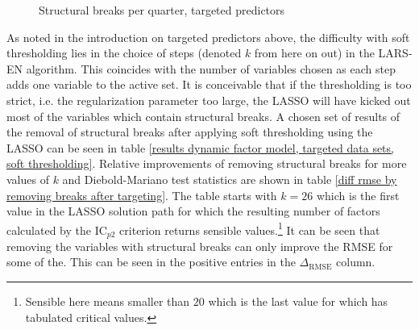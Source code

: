 \documentclass[12pt]{article}
\begin{document}
\begin{figure}[htp]
\centering
{}
\caption{Structural breaks per quarter, targeted predictors}
\label{structural breaks per period, targeted predictors}
\end{figure}



\clearpage

As noted in the introduction on targeted predictors above, the difficulty with soft thresholding lies in the choice of steps (denoted $k$ from here on out) in the LARS-EN algorithm. This coincides with the number of variables chosen as each step adds one variable to the active set. It is conceivable that if the thresholding is too strict, i.e. the regularization parameter too large, the LASSO will have kicked out most of the variables which contain structural breaks. A chosen set of results of the removal of structural breaks after applying soft thresholding using the LASSO can be seen in table \ref{results dynamic factor model, targeted data sets, soft thresholding}. Relative improvements of removing structural breaks for more values of $k$ and Diebold-Mariano test statistics are shown in table \ref{diff rmse by removing breaks after targeting}. The table starts with $k=26$ which is the first value in the LASSO solution path for which the resulting number of factors calculated by the IC$_{p2}$ criterion returns sensible values.\footnote{Sensible here means smaller than $20$ which is the last value for which \citet{andrews2003tests} has tabulated critical values.}
It can be seen that removing the variables with structural breaks can only improve the RMSE for some of the. This can be seen in the positive entries in the $\Delta_{\text{RMSE}}$ column.
\end{document}
